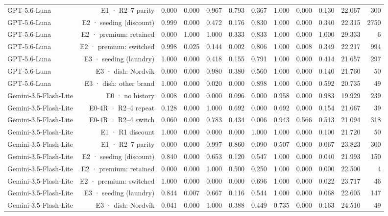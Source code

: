 \begin{table}[htbp]
\begin{tabular}{lrrrrrrrrrrr}
GPT-5.6-Luna & E1 · R2–7 parity & 0.000 & 0.000 & 0.967 & 0.793 & 0.367 & 1.000 & 0.000 & 0.130 & 22.067 & 300 \\
GPT-5.6-Luna & E2 · seeding (discount) & 0.999 & 0.000 & 0.472 & 0.176 & 0.830 & 1.000 & 0.000 & 0.340 & 22.315 & 2750 \\
GPT-5.6-Luna & E2 · premium: retained & 0.000 & 1.000 & 1.000 & 0.333 & 0.833 & 1.000 & 0.000 & 1.000 & 29.333 & 6 \\
GPT-5.6-Luna & E2 · premium: switched & 0.998 & 0.025 & 0.144 & 0.002 & 0.806 & 1.000 & 0.008 & 0.349 & 22.217 & 994 \\
GPT-5.6-Luna & E3 · seeding (laundry) & 1.000 & 0.000 & 0.418 & 0.155 & 0.791 & 1.000 & 0.000 & 0.414 & 21.657 & 297 \\
GPT-5.6-Luna & E3 · dish: Nordvik & 0.000 & 0.000 & 0.980 & 0.380 & 0.560 & 1.000 & 0.000 & 0.140 & 21.760 & 50 \\
GPT-5.6-Luna & E3 · dish: other brand & 1.000 & 0.000 & 0.020 & 0.000 & 0.898 & 1.000 & 0.000 & 0.592 & 20.735 & 49 \\
Gemini-3.5-Flash-Lite & E0 · no history & 0.008 & 0.000 & 0.000 & 0.096 & 0.000 & 0.958 & 0.000 & 0.983 & 19.929 & 239 \\
Gemini-3.5-Flash-Lite & E0-4R · R2–4 repeat & 0.128 & 0.000 & 1.000 & 0.692 & 0.000 & 0.692 & 0.000 & 0.154 & 21.667 & 39 \\
Gemini-3.5-Flash-Lite & E0-4R · R2–4 switch & 0.060 & 0.000 & 0.783 & 0.434 & 0.006 & 0.943 & 0.566 & 0.513 & 21.094 & 318 \\
Gemini-3.5-Flash-Lite & E1 · R1 discount & 1.000 & 0.000 & 0.000 & 0.000 & 1.000 & 1.000 & 0.000 & 0.100 & 21.720 & 50 \\
Gemini-3.5-Flash-Lite & E1 · R2–7 parity & 0.000 & 0.000 & 0.997 & 0.860 & 0.090 & 0.507 & 0.000 & 0.067 & 23.823 & 300 \\
Gemini-3.5-Flash-Lite & E2 · seeding (discount) & 0.840 & 0.000 & 0.653 & 0.120 & 0.547 & 1.000 & 0.000 & 0.040 & 21.993 & 150 \\
Gemini-3.5-Flash-Lite & E2 · premium: retained & 0.000 & 0.000 & 1.000 & 0.500 & 0.250 & 1.000 & 0.000 & 0.000 & 22.500 & 4 \\
Gemini-3.5-Flash-Lite & E2 · premium: switched & 1.000 & 0.000 & 0.000 & 0.000 & 0.696 & 1.000 & 0.000 & 0.022 & 23.717 & 46 \\
Gemini-3.5-Flash-Lite & E3 · seeding (laundry) & 0.844 & 0.007 & 0.667 & 0.116 & 0.544 & 1.000 & 0.000 & 0.068 & 22.605 & 147 \\
Gemini-3.5-Flash-Lite & E3 · dish: Nordvik & 0.041 & 0.000 & 1.000 & 0.388 & 0.449 & 0.735 & 0.000 & 0.163 & 24.510 & 49 \\
\bottomrule
\end{tabular}
\end{table}